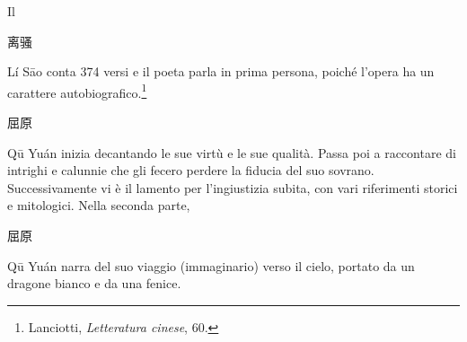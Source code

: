 \documentclass[12pt,titlepage]{article}
\begin{document}
Il 
\begin{CJK*}{UTF8}{gbsn}离骚\end{CJK*}
 Lí Sāo conta 374 versi e il poeta parla in prima persona, poiché l'opera ha un carattere autobiografico.\footnote{Lanciotti, \emph{Letteratura cinese}, 60.}
 
\begin{CJK*}{UTF8}{gbsn}屈原 \end{CJK*}
Qū Yuán inizia decantando le sue virtù e le sue qualità. Passa poi a raccontare di intrighi e calunnie che gli fecero perdere la fiducia del suo sovrano. Successivamente vi è il lamento per l'ingiustizia subita, con vari riferimenti storici e mitologici. Nella seconda parte,
 \begin{CJK*}{UTF8}{gbsn}屈原\end{CJK*}
  Qū Yuán narra del suo viaggio (immaginario) verso il cielo, portato da un dragone bianco e da una fenice. 
  
\end{document}
